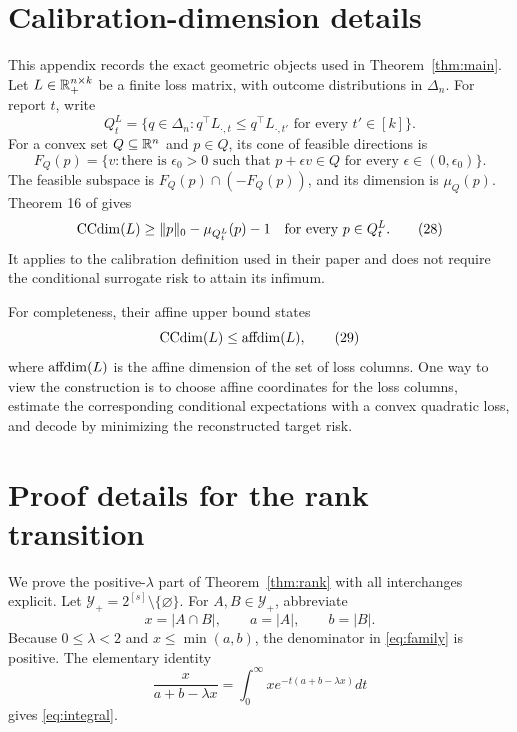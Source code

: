 \section{Calibration-dimension details}
\label{app:ccdim}

This appendix records the exact geometric objects used in
Theorem~\ref{thm:main}. Let $L\in\mathbb R_+^{n\times k}$ be a finite loss matrix,
with outcome distributions in $\Delta_n$. For report $t$, write
\[
 Q_t^L=\{q\in\Delta_n:q^\top L_{\cdot,t}
            \leq q^\top L_{\cdot,t'}\text{ for every }t'\in[k]\}.
 \tag{27}\label{eq:triggerapp}
\]
For a convex set $Q\subseteq\mathbb R^n$ and $p\in Q$, its cone of feasible
directions is
\[
 F_Q(p)=\{v:\text{there is }\epsilon_0>0\text{ such that }
 p+\epsilon v\in Q\text{ for every }\epsilon\in(0,\epsilon_0)\}.
\]
The feasible subspace is $F_Q(p)\cap(-F_Q(p))$, and its dimension is
$\mu_Q(p)$. Theorem 16 of \citet{ramaswamy2016ccdim} gives
\[
 \operatorname{CCdim}(L)\geq\|p\|_0-\mu_{Q_t^L}(p)-1
 \quad\text{for every }p\in Q_t^L.
 \tag{28}\label{eq:ramatheorem}
\]
It applies to the calibration definition used in their paper and does not
require the conditional surrogate risk to attain its infimum.

For completeness, their affine upper bound states
\[
 \operatorname{CCdim}(L)\leq\operatorname{affdim}(L),
 \tag{29}\label{eq:affupper}
\]
where $\operatorname{affdim}(L)$ is the affine dimension of the set of loss columns. One
way to view the construction is to choose affine coordinates for the loss
columns, estimate the corresponding conditional expectations with a convex
quadratic loss, and decode by minimizing the reconstructed target risk.

\section{Proof details for the rank transition}
\label{app:rank}

We prove the positive-$\lambda$ part of Theorem~\ref{thm:rank} with all
interchanges explicit. Let $\mathcal Y_+=2^{[s]}\setminus\{\varnothing\}$.
For $A,B\in\mathcal Y_+$, abbreviate
\[
 x=|A\cap B|,\qquad a=|A|,\qquad b=|B|.
\]
Because $0\leq\lambda<2$ and $x\leq\min(a,b)$, the denominator in
\eqref{eq:family} is positive. The elementary identity
\[
 \frac{x}{a+b-\lambda x}
 =\int_0^\infty xe^{-t(a+b-\lambda x)}dt
 \tag{30}\label{eq:laplaceapp}
\]
gives \eqref{eq:integral}.

